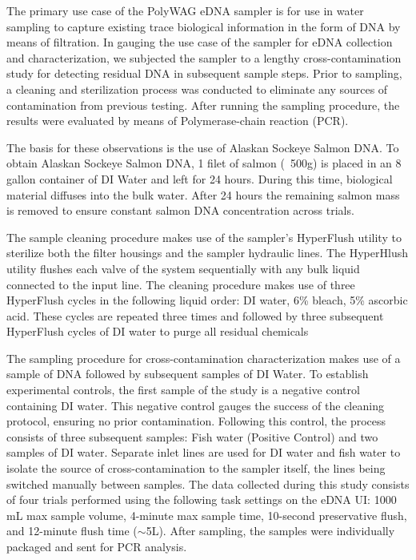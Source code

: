 \documentclass[11pt, letterpaper]{article}
\begin{document}
The primary use case of the PolyWAG eDNA sampler is for use in water sampling to capture existing trace biological information in the form of DNA by means of filtration. In gauging the use case of the sampler for eDNA collection and characterization, we subjected the sampler to a lengthy cross-contamination study for detecting residual DNA in subsequent sample steps. Prior to sampling, a cleaning and sterilization process was conducted to eliminate any sources of contamination from previous testing. After running the sampling procedure, the results were evaluated by means of Polymerase-chain reaction (PCR).
\newline\par
The basis for these observations is the use of Alaskan Sockeye Salmon DNA. To obtain Alaskan Sockeye Salmon DNA, 1 filet of salmon (~500g) is placed in an 8 gallon container of DI Water and left for 24 hours. During this time, biological material diffuses into the bulk water. After 24 hours the remaining salmon mass is removed to ensure constant salmon DNA concentration across trials.
\newline\par
The sample cleaning procedure makes use of the sampler’s HyperFlush utility to sterilize both the filter housings and the sampler hydraulic lines. The HyperHlush utility flushes each valve of the system sequentially with any bulk liquid connected to the input line. The cleaning procedure makes use of three HyperFlush cycles in the following liquid order: DI water, 6\% bleach, 5\% ascorbic acid. These cycles are repeated three times and followed by three subsequent HyperFlush cycles of DI water to purge all residual chemicals
\newline\par
The sampling procedure for cross-contamination characterization makes use of a sample of DNA followed by subsequent samples of DI Water. To establish experimental controls, the first sample of the study is a negative control containing DI water. This negative control gauges the success of the cleaning protocol, ensuring no prior contamination. Following this control, the process consists of three subsequent samples: Fish water (Positive Control) and two samples of DI water. Separate inlet lines are used for DI water and fish water to isolate the source of cross-contamination to the sampler itself, the lines being switched manually between samples. The data collected during this study consists of four trials performed using the following task settings on the eDNA UI: 1000 mL max sample volume, 4-minute max sample time, 10-second preservative flush, and 12-minute flush time ($\sim$5L). After sampling, the samples were individually packaged and sent for PCR analysis. 
\end{document}
